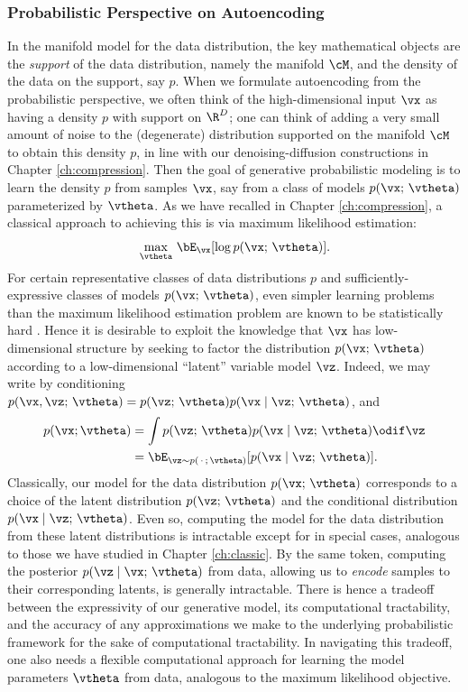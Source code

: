 \documentclass[../../book-main.tex]{subfiles}
\begin{document}
\subsubsection{Probabilistic Perspective on Autoencoding}
In the manifold model for the data distribution, the key mathematical objects
are the \textit{support} of the data distribution, namely the manifold $\cM$,
and the density of the data on the support, say $p$. When we formulate
autoencoding from the probabilistic perspective, we often think of the
high-dimensional input $\vx$ as having a density $p$ with support on $\R^D$; one
can think of adding a very small amount of noise to the (degenerate)
distribution supported on the manifold $\cM$ to obtain this density $p$, in line
with our denoising-diffusion constructions in Chapter \ref{ch:compression}.
Then the goal of generative probabilistic modeling is to learn the density $p$
from samples $\vx$, say from a class of models $p(\vx;\, \vtheta)$ parameterized
by $\vtheta$. As we have recalled in Chapter \ref{ch:compression}, a classical
approach to achieving this is via maximum likelihood estimation:
\begin{equation*}\label{eq:VAE-MLE}
\max_{\vtheta}\, \bE_{\vx}[ \log p(\vx;\, \vtheta) ].
\end{equation*}
For certain representative classes of data distributions $p$ %
and sufficiently-expressive classes of models $p(\vx;\, \vtheta)$, even simpler
learning problems than the maximum likelihood estimation problem are known to be
statistically hard \cite{Yang1999-wb}. Hence it is desirable to exploit the
knowledge that $\vx$ has low-dimensional structure by seeking to factor the
distribution $p(\vx ;\, \vtheta)$ according to a low-dimensional ``latent''
variable model $\vz$. Indeed, we may write by conditioning $p(\vx,
\vz ;\, \vtheta)
= p(\vz;\, \vtheta) p(\vx \mid \vz;\, \vtheta)$, and
\begin{align*}
p(\vx; \vtheta) &= \int p(\vz;\, \vtheta) p(\vx \mid \vz;\, \vtheta) \odif \vz
\\
&=
\bE_{\vz \sim p(\,\cdot\,;\, \vtheta)}[ p(\vx \mid \vz;\, \vtheta) ].
\end{align*}
Classically, our model for the data distribution $p(\vx;\, \vtheta)$ corresponds
to a choice of the latent distribution $p(\vz;\, \vtheta)$ and the conditional
distribution $p(\vx \mid \vz;\, \vtheta)$.
Even so, computing the model for the data distribution from these latent
distributions is intractable except for in special cases, analogous to those we
have studied in Chapter \ref{ch:classic}.
By the same token, computing the posterior $p(\vz \mid \vx;\, \vtheta)$ from
data, allowing us to \textit{encode} samples to their corresponding latents, is
generally intractable.
There is hence a tradeoff between the expressivity of our generative model,
its computational tractability, and the accuracy of any approximations we make
to the underlying probabilistic framework for the sake of
computational tractability.
In navigating this tradeoff, one also needs a flexible computational approach
for learning the model parameters $\vtheta$ from data, analogous to the maximum
likelihood objective.
\end{document}
